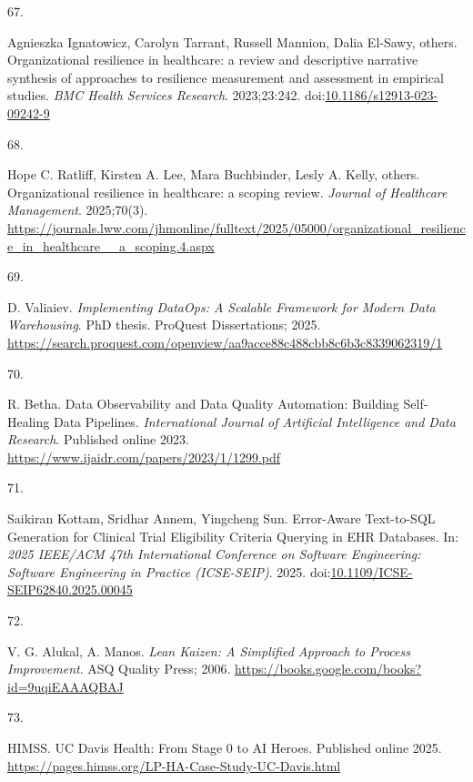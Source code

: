 \documentclass[
  american,
  11pt,
  letterpaper,
  oneside  ,captions=tableheading
]{scrartcl}
\newlength{\cslhangindent}
\newlength{\csllabelwidth}
\newenvironment{CSLReferences}[2] %
 {\begin{list}{}{%
  \setlength{\itemindent}{0pt}
  \setlength{\leftmargin}{0pt}
  \setlength{\parsep}{0pt}
  \ifodd #1
   \setlength{\leftmargin}{\cslhangindent}
   \setlength{\itemindent}{-1\cslhangindent}
  \fi
  \setlength{\itemsep}{#2\baselineskip}}}
 {\end{list}}
\newcommand{\CSLLeftMargin}[1]{\parbox[t]{\csllabelwidth}{\strut#1\strut}}
\newcommand{\CSLRightInline}[1]{\parbox[t]{\linewidth - \csllabelwidth}{\strut#1\strut}}
\begin{document}
\begin{CSLReferences}{0}{1}
\CSLLeftMargin{67. }%
\CSLRightInline{Agnieszka Ignatowicz, Carolyn Tarrant, Russell Mannion,
Dalia El-Sawy, others. {Organizational resilience in healthcare: a
review and descriptive narrative synthesis of approaches to resilience
measurement and assessment in empirical studies}. \emph{BMC Health
Services Research}. 2023;23:242.
doi:\href{https://doi.org/10.1186/s12913-023-09242-9}{10.1186/s12913-023-09242-9}}

\CSLLeftMargin{68. }%
\CSLRightInline{Hope C. Ratliff, Kirsten A. Lee, Mara Buchbinder, Lesly
A. Kelly, others. {Organizational resilience in healthcare: a scoping
review}. \emph{Journal of Healthcare Management}. 2025;70(3).
\url{https://journals.lww.com/jhmonline/fulltext/2025/05000/organizational_resilience_in_healthcare__a_scoping.4.aspx}}

\CSLLeftMargin{69. }%
\CSLRightInline{D. Valiaiev. \emph{{Implementing DataOps: A Scalable
Framework for Modern Data Warehousing}}. PhD thesis. ProQuest
Dissertations; 2025.
\url{https://search.proquest.com/openview/aa9acce88c488cbb8c6b3c8339062319/1}}

\CSLLeftMargin{70. }%
\CSLRightInline{R. Betha. {Data Observability and Data Quality
Automation: Building Self-Healing Data Pipelines}. \emph{International
Journal of Artificial Intelligence and Data Research}. Published online
2023. \url{https://www.ijaidr.com/papers/2023/1/1299.pdf}}

\CSLLeftMargin{71. }%
\CSLRightInline{Saikiran Kottam, Sridhar Annem, Yingcheng Sun.
{Error-Aware Text-to-SQL Generation for Clinical Trial Eligibility
Criteria Querying in EHR Databases}. In: \emph{2025 IEEE/ACM 47th
International Conference on Software Engineering: Software Engineering
in Practice (ICSE-SEIP)}. 2025.
doi:\href{https://doi.org/10.1109/ICSE-SEIP62840.2025.00045}{10.1109/ICSE-SEIP62840.2025.00045}}

\CSLLeftMargin{72. }%
\CSLRightInline{V. G. Alukal, A. Manos. \emph{Lean Kaizen: A Simplified
Approach to Process Improvement}. ASQ Quality Press; 2006.
\url{https://books.google.com/books?id=9uqiEAAAQBAJ}}

\CSLLeftMargin{73. }%
\CSLRightInline{HIMSS. {UC Davis Health: From Stage 0 to AI Heroes}.
Published online 2025.
\url{https://pages.himss.org/LP-HA-Case-Study-UC-Davis.html}}


\end{CSLReferences}
\end{document}
